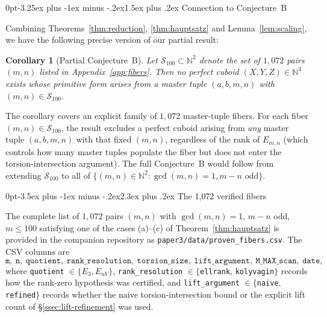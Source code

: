 \documentclass[12pt,a4paper,reqno]{amsart}
\makeatletter
\renewcommand{\section}{\@startsection{section}{1}%
  {0pt}{-3.5ex plus -1ex minus -.2ex}{2.3ex plus .2ex}%
  {\normalfont\large\bfseries}}
\renewcommand{\subsection}{\@startsection{subsection}{2}%
  {0pt}{-3.25ex plus -1ex minus -.2ex}{1.5ex plus .2ex}%
  {\normalfont\normalsize\bfseries}}
\theoremstyle{plain}
\newtheorem{corollary}[theorem]{Corollary}
\theoremstyle{definition}
\theoremstyle{remark}
\newcommand{\N}{\mathbb{N}}
\makeatother
\begin{document}
\subsection{Connection to Conjecture~B}

Combining Theorems~\ref{thm:reduction}, \ref{thm:hauptsatz} and Lemma~\ref{lem:scaling}, we have the following precise version of our partial result:

\begin{corollary}[Partial Conjecture~B]
\label{cor:partial-B}
Let $\mathcal{S}_{100} \subset \N^2$ denote the set of $1{,}072$ pairs $(m, n)$ listed in Appendix~\ref{app:fibers}. Then no perfect cuboid $(X, Y, Z) \in \N^3$ exists whose primitive form arises from a master tuple $(a, b, m, n)$ with $(m, n) \in \mathcal{S}_{100}$.
\end{corollary}

The corollary covers an explicit family of $1{,}072$ master-tuple fibers. For each fiber $(m, n) \in \mathcal{S}_{100}$, the result excludes a perfect cuboid arising from \emph{any} master tuple $(a, b, m, n)$ with that fixed $(m, n)$, regardless of the rank of $E_{m, n}$ (which controls how many master tuples populate the fiber but does not enter the torsion-intersection argument). The full Conjecture~B would follow from extending $\mathcal{S}_{100}$ to all of $\{(m, n) \in \N^2 : \gcd(m, n) = 1, m - n \text{ odd}\}$.

\appendix

\section{The 1{,}072 verified fibers}
\label{app:fibers}

The complete list of $1{,}072$ pairs $(m, n)$ with $\gcd(m, n) = 1$, $m - n$ odd, $m \le 100$ satisfying one of the cases (a)--(c) of Theorem~\ref{thm:hauptsatz} is provided in the companion repository as \texttt{paper3/data/proven\_fibers.csv}. The CSV columns are
$$
\texttt{m},\ \texttt{n},\ \texttt{quotient},\ \texttt{rank\_resolution},\ \texttt{torsion\_size},\ \texttt{lift\_argument},\ \texttt{M\_MAX\_scan},\ \texttt{date},
$$
where \texttt{quotient} $\in \{E_3, E_{uV}\}$, \texttt{rank\_resolution} $\in \{$\texttt{ellrank}, \texttt{kolyvagin}$\}$ records how the rank-zero hypothesis was certified, and \texttt{lift\_argument} $\in \{$\texttt{naive}, \texttt{refined}$\}$ records whether the naive torsion-intersection bound or the explicit lift count of \S\ref{ssec:lift-refinement} was used.
\end{document}
